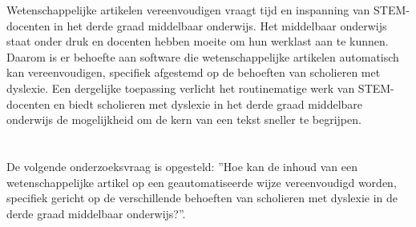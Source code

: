\newline

Wetenschappelijke artikelen vereenvoudigen vraagt tijd en inspanning van STEM-docenten in het derde graad middelbaar onderwijs. Het middelbaar onderwijs staat onder druk en docenten hebben moeite om hun werklast aan te kunnen. Daarom is er behoefte aan software die wetenschappelijke artikelen automatisch kan vereenvoudigen, specifiek afgestemd op de behoeften van scholieren met dyslexie. Een dergelijke toepassing verlicht het routinematige werk van STEM-docenten en biedt scholieren met dyslexie in het derde graad middelbare onderwijs de mogelijkheid om de kern van een tekst sneller te begrijpen.


\section{}%
\label{sec:onderzoeksvraag}



De volgende onderzoeksvraag is opgesteld: ”Hoe kan de inhoud van een wetenschappelijke artikel op een geautomatiseerde wijze vereenvoudigd worden, specifiek gericht op de verschillende behoeften van scholieren met dyslexie in de derde graad middelbaar onderwijs?”.


